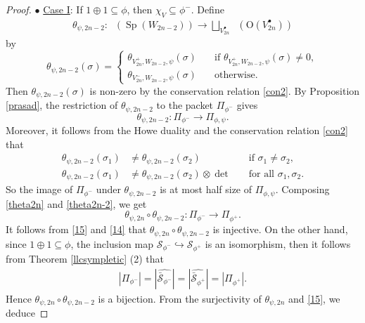 \documentclass[article]{article}
\numberwithin{equation}{section}
\theoremstyle{definition}
\DeclareMathOperator{\SP}{Sp}
\DeclareMathOperator{\Irrt}{Irr_{temp}}
\begin{document}
\begin{proof}
$\bullet$ \underline{Case I}: If $\mathrm{1}\oplus\mathrm{1} \subseteq \phi$, then $\chi_{V}\subseteq \phi^{-}$. Define
		\begin{align*}
		\theta_{\psi,2n-2}: \Irrt \left(\SP(W_{2n-2})\right) \longrightarrow  \bigsqcup_{V_{2n}^\bullet} \Irrt \left(\mathrm O(V_{2n}^{\bullet})\right)
		\end{align*} 
		by 
		$$
		\theta_{\psi,2n-2}(\sigma)= 
		\begin{cases}
		\theta_{V^{+}_{2n},W_{2n-2},\psi}(\sigma) \quad &\mbox{if}\,\, \theta_{V^{+}_{2n},W_{2n-2},\psi}(\sigma)\neq 0,\\
		\theta_{V^{-}_{2n},W_{2n-2},\psi}(\sigma) &\mbox{otherwise}.
		\end{cases}
		$$
		Then $\theta_{\psi,2n-2}(\sigma)$ is non-zero by the conservation relation \ref{con2}. By Proposition \ref{prasad}, the restriction of $\theta_{\psi,2n-2}$ to the packet $\Pi_{\phi^{-}}$ gives  
		\begin{equation}\label{theta2n-2}
		\theta_{\psi,2n-2}: \Pi_{\phi^{-}}\longrightarrow \Pi_{\phi,\psi}.
		\end{equation}
		Moreover, it follows from the Howe duality and the conservation relation \ref{con2} that
		\begin{equation}\label{14}
		\begin{aligned}
		\theta_{\psi,2n-2}(\sigma_1)&\neq \theta_{\psi,2n-2}(\sigma_2) \quad &\mbox{if $\sigma_1\neq\sigma_2$} ,\\
		\theta_{\psi,2n-2}(\sigma_1)&\neq \theta_{\psi,2n-2}(\sigma_2)\otimes \det\quad &\mbox{for all  $\sigma_1,\sigma_2$}.
		\end{aligned}
		\end{equation} 
		So the image of $\Pi_{\phi^{-}}$ under $\theta_{\psi,2n-2}$ is at most half size of $\Pi_{\phi,\psi}$. Composing \ref{theta2n} and \ref{theta2n-2}, we get 
		$$
		\theta_{\psi,2n}\circ \theta_{\psi,2n-2}: \Pi_{\phi^{-}} \longrightarrow \Pi_{\phi^{+}}. 
		$$
		It follows from \ref{15} and \ref{14} that $\theta_{\psi,2n}\circ \theta_{\psi,2n-2}$ is injective. On the other hand, since $\mathrm 1\oplus\mathrm 1\subseteq \phi$, the inclusion map $\mathcal S_{\phi^{-}}\hookrightarrow \mathcal S_{\phi^+}$ is an isomorphism, then it follows from Theorem \ref{llcsympletic} (2) that 
		\begin{align}\label{135}
		|\Pi_{\phi^{-}}|=|\widehat{\bar {\mathcal S}_{\phi^-}}|=|\widehat{\bar {\mathcal S}_{\phi^+}}|=|\Pi_{\phi^{+}}|. 
		\end{align}
		Hence $\theta_{\psi,2n}\circ \theta_{\psi,2n-2}$ is a bijection. From the surjectivity of $\theta_{\psi,2n}$ and \ref{15}, we deduce 

\end{proof}
\end{document}
